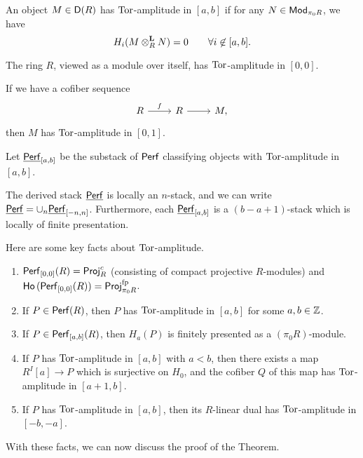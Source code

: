 \documentclass{amsart}
\begin{document}
\begin{dfn}
	An object $M \in \mathsf{D}(R)$ has $\operatorname{Tor}$-amplitude in $[a, b]$ if for any $N \in \mathsf{Mod}_{\pi_0 R}$, we have
	\[
		H_i(M \otimes^{\mathbf{L}}_R N) = 0 \hspace{2em} \forall i \not\in [a, b].
	\]
\end{dfn}

\begin{ex}
	The ring $R$, viewed as a module over itself, has $\operatorname{Tor}$-amplitude in $[0, 0]$.
\end{ex}

\begin{ex}
	If we have a cofiber sequence
	\[
		\begin{tikzcd}
			R \rar["f"] & R \rar & M,
		\end{tikzcd}
	\]
	then $M$ has $\operatorname{Tor}$-amplitude in $[0, 1]$.
\end{ex}

Let $\underline{\mathsf{Perf}}_{[a,b]}$ be the substack of $\mathsf{Perf}$ classifying objects with $\operatorname{Tor}$-amplitude in $[a, b]$.

\begin{thm}[To\"en-Vaqui\'e]
	The derived stack $\underline{\mathsf{Perf}}$ is locally an $n$-stack, and we can write $\underline{\mathsf{Perf}} = \cup_n \underline{\mathsf{Perf}}_{[-n, n]}$.
	Furthermore, each $\underline{\mathsf{Perf}}_{[a,b]}$ is a $(b - a + 1)$-stack which is locally of finite presentation.
\end{thm}

Here are some key facts about $\operatorname{Tor}$-amplitude.

\begin{enumerate}
	\item $\mathsf{Perf}_{[0,0]}(R) = \mathsf{Proj}_R^c$ (consisting of compact projective $R$-modules) and $\mathsf{Ho}\,(\mathsf{Perf}_{[0,0]}(R)) = \mathsf{Proj}_{\pi_0 R}^{\mathrm{fp}}$.
	\item If $P \in \mathsf{Perf}(R)$, then $P$ has $\operatorname{Tor}$-amplitude in $[a,b]$ for some $a, b \in \mathbb{Z}$.
	\item If $P \in \mathsf{Perf}_{[a,b]}(R)$, then $H_a(P)$ is finitely presented as a $(\pi_0 R)$-module.
	\item If $P$ has $\operatorname{Tor}$-amplitude in $[a, b]$ with $a < b$, then there exists a map $R^I[a] \to P$ which is surjective on $H_0$, and the cofiber $Q$ of this map has $\operatorname{Tor}$-amplitude in $[a+1, b]$.
	\item If $P$ has $\operatorname{Tor}$-amplitude in $[a, b]$, then its $R$-linear dual has $\operatorname{Tor}$-amplitude in $[-b, -a]$.
\end{enumerate}

With these facts, we can now discuss the proof of the Theorem.
\end{document}
